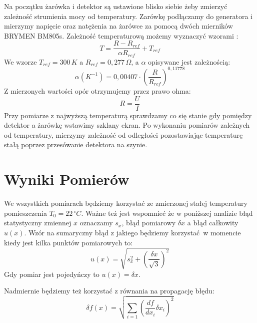 \documentclass[12pt]{article}
\begin{document}
Na początku żarówka i detektor są ustawione blisko siebie żeby zmierzyć zależność strumienia mocy od temperatury.
Zarówkę podłączamy do generatora i mierzymy napięcie oraz natężenia na żarówce za pomocą dwóch mierników BRYMEN BM805s. Zależność temperaturową możemy wyznaczyć wzorami \cite{skrypt}:
\begin{equation}
    T = \frac{R - R_{ref}}{\alpha R_{ref}} + T_{ref}
    \label{eq:temp_bulb}
\end{equation}
We wzorze $T_{ref} = 300\,K$ a $R_{ref} = 0{,}277\, \Omega$, a $\alpha$ opisywane jest zależnością:
\[
    \alpha(K^{-1}) = 0{,}00407 \cdot (\frac{R}{R_{ref}})^{0{,}11778}
\]
Z mierzonych wartości opór otrzymujemy przez prawo ohma:
\[
    R = \frac{U}{I}
\]
Przy pomiarze z najwyższą temperaturą sprawdzamy co się stanie gdy pomiędzy detektor a żarówkę wstawimy szklany ekran.
Po wykonaniu pomiarów zależnych od temperatury, mierzymy zależność od odległości pozostawiając temperaturę stałą poprzez przesówanie detektora na szynie.
\section{Wyniki Pomierów}
We wszystkich pomiarach będziemy korzystać ze zmierzonej stałej temperatury pomieszczenia $T_0 = 22 \, ^{\circ}C$.
Ważne też jest wspomnieć że w poniższej analizie błąd statystyczny zmiennej $x$ oznaczamy $s_x$, błąd pomiarowy $\delta x$ a błąd całkowity $u(x)$.
Wzór na sumaryczny błąd z jakiego będziemy korzystać w momencie kiedy jest kilka punktów pomiarowych to:
\begin{equation}
    u(x) = \sqrt{s_x^2 + (\frac{\delta x}{\sqrt{3}})^2}
    \label{eq:combined_error}
\end{equation}
Gdy pomiar jest pojedyńczy to $u(x) = \delta x$.

Nadmiernie będziemy też korzystać z równania na propagację błędu:
\begin{equation}
    \delta f(x) = \sqrt{\sum_{i=1} (\frac{df}{dx_i} \delta x_i)^2}
    \label{eq:error_propagation}
\end{equation}
\end{document}
